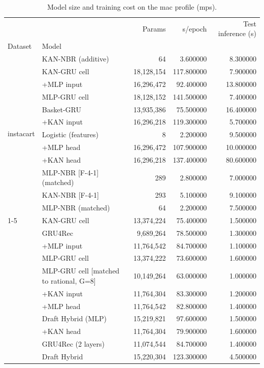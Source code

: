 \begin{table}[H]
\centering\small
\caption{Model size and training cost on the mac profile (mps).}
\label{tab:cost}
\begin{tabular}{llrrr}
\toprule
 &  & Params & s/epoch & Test inference (s) \\
Dataset & Model &  &  &  \\
\midrule
\multirow[t]{12}{*}{instacart} & KAN-NBR (additive) & 64 & 3.600000 & 8.300000 \\
 & KAN-GRU cell & 18,128,154 & 117.800000 & 7.900000 \\
 & +MLP input & 16,296,472 & 92.400000 & 13.800000 \\
 & MLP-GRU cell & 18,128,152 & 141.500000 & 7.400000 \\
 & Basket-GRU & 13,935,386 & 75.500000 & 16.400000 \\
 & +KAN input & 16,296,218 & 119.300000 & 5.700000 \\
 & Logistic (features) & 8 & 2.200000 & 9.500000 \\
 & +MLP head & 16,296,472 & 107.900000 & 10.000000 \\
 & +KAN head & 16,296,218 & 137.400000 & 80.600000 \\
 & MLP-NBR [F-4-1] (matched) & 289 & 2.800000 & 7.000000 \\
 & KAN-NBR [F-4-1] & 293 & 5.100000 & 9.100000 \\
 & MLP-NBR (matched) & 64 & 2.200000 & 7.500000 \\
\cline{1-5}
\multirow[t]{14}{*}{yoochoose64} & KAN-GRU cell & 13,374,224 & 75.400000 & 1.500000 \\
 & GRU4Rec & 9,689,264 & 78.500000 & 1.300000 \\
 & +MLP input & 11,764,542 & 84.700000 & 1.100000 \\
 & MLP-GRU cell & 13,374,222 & 73.600000 & 1.600000 \\
 & MLP-GRU cell [matched to rational, G=8] & 10,149,264 & 63.000000 & 1.000000 \\
 & +KAN input & 11,764,304 & 83.300000 & 1.200000 \\
 & +MLP head & 11,764,542 & 82.800000 & 1.400000 \\
 & Draft Hybrid (MLP) & 15,219,821 & 97.600000 & 1.500000 \\
 & +KAN head & 11,764,304 & 79.900000 & 1.600000 \\
 & GRU4Rec (2 layers) & 11,074,544 & 84.700000 & 1.400000 \\
 & Draft Hybrid & 15,220,304 & 123.300000 & 4.500000 \\

\end{tabular}
\end{table}

